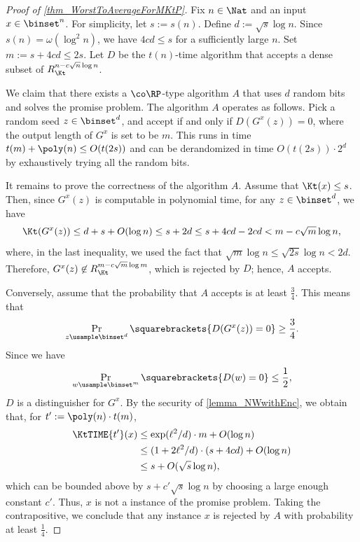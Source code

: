 \documentclass[11pt]{article}
\numberwithin{equation}{section}
\theoremstyle{definition}
\theoremstyle{plain}
\begin{document}
\begin{proof}
  [Proof of \cref{thm_WorstToAverageForMKtP}]
  Fix $n \in \Nat$ and an input $x \in \binset^n$.
  For simplicity, let $s := s(n)$.
  Define $d := \sqrt{s} \log n$.  Since $s(n) = \omega(\log^2 n)$, we have $4 c d \le s$ for a sufficiently large $n$.
  Set $m := s + 4 c d \le 2 s$.
  Let $D$ be the $t(n)$-time algorithm that accepts a dense subset of $R_\Kt^{n - c \sqrt{n} \log n}$.

  We claim that there exists a $\co\RP$-type algorithm $A$ that
  uses $d$ random bits and
  solves the promise problem.
  The algorithm $A$ operates as follows.
  Pick a random seed $z \in \binset^d$, and accept if and only if $D(G^x(z)) = 0$,
  where the output length of $G^x$ is set to be $m$.
  This runs in time $t(m) + \poly(n) \le O(t(2 s))$ and can be derandomized in time $O(t(2 s)) \cdot 2^d$ by exhaustively trying all the random bits.

  It remains to prove the correctness of the algorithm $A$.
  Assume that $\Kt(x) \le s$.
  Then, since $G^x(z)$ is computable in polynomial time,
  for any $z \in \binset^d$, we have
  $$\Kt(G^x(z)) \le d + s + O(\log n) \le s + 2 d \le s + 4 c d - 2 c d < m - c \sqrt{m} \log n,$$
  where, in the last inequality, we used the fact that $\sqrt{m} \log n \le \sqrt{2 s} \log n < 2 d$.
  Therefore, $G^x(z) \not\in R_\Kt^{m - c \sqrt{m} \log m}$, which is rejected by $D$; hence, $A$ accepts.

  Conversely, assume that the probability that $A$ accepts is at least $\frac{3}{4}$.
  This means that $$\Pr_{z \usample \binset^d} \squarebrackets{ D(G^x(z)) = 0 } \ge \frac{3}{4}.$$
  Since we have $$\Pr_{w \usample \binset^m} \squarebrackets{ D(w) = 0 } \le \frac{1}{2},$$
  $D$ is a distinguisher for $G^x$.
  By the security of \cref{lemma_NWwithEnc},
  we obtain that, for $t' := \poly(n) \cdot t(m)$,
  \begin{align*}
    \KtTIME{t'}(x) & \le \exp(\ell^2 / d) \cdot m + O(\log n)
    \\ & \le (1 + 2 \ell^2 / d) \cdot (s + 4 c d) + O(\log n)
    \\ & \le s + O(\sqrt{s} \log n),
  \end{align*}
  which can be bounded above by $s + c' \sqrt{s} \log n$
  by choosing a large enough constant $c'$.
  Thus, $x$ is not a \No instance of the promise problem.
  Taking the contrapositive,
  we conclude that any \No instance $x$ is rejected by $A$ with probability at least $\frac{1}{4}$.
\end{proof}
\end{document}
